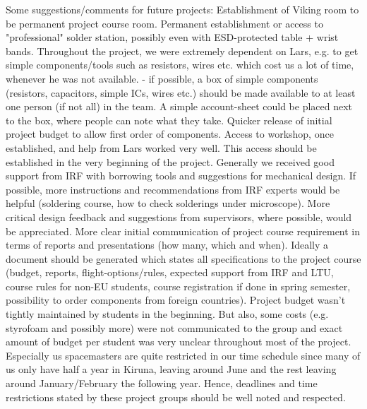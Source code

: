 Some suggestions/comments for future projects:
Establishment of Viking room to be permanent project course room. 
Permanent establishment or access to "professional" solder station, possibly even with ESD-protected table + wrist bands.
Throughout the project, we were extremely dependent on Lars, e.g. to get simple components/tools such as resistors, wires etc. which cost us a lot of time, whenever he was not available. - if possible, a box of simple components (resistors, capacitors, simple ICs, wires etc.) should be made available to at least one person (if not all) in the team. A simple account-sheet could be placed next to the box, where people can note what they take.
Quicker release of initial project budget to allow first order of components.  
Access to workshop, once established, and help from Lars worked very well. This access should be established in the very beginning of the project.
Generally we received good support from IRF with borrowing tools and suggestions for mechanical design. If possible, more instructions and recommendations from IRF experts would be helpful (soldering course, how to check solderings under microscope).
More critical design feedback and suggestions from supervisors, where possible, would be appreciated.
More clear initial communication of project course requirement in terms of reports and presentations (how many, which and when). Ideally a document should be generated which states all specifications to the project course (budget, reports, flight-options/rules, expected support from IRF and LTU, course rules for non-EU students, course registration if done in spring semester, possibility to order components from foreign countries).
Project budget wasn't tightly maintained by students in the beginning. But also, some costs (e.g. styrofoam and possibly more) were not communicated to the group and exact amount of budget per student was very unclear throughout most of the project.
Especially us spacemasters are quite restricted in our time schedule since many of us only have half a year in Kiruna, leaving around June and the rest leaving around January/February the following year. Hence, deadlines and time restrictions stated by these project groups should be well noted and respected.